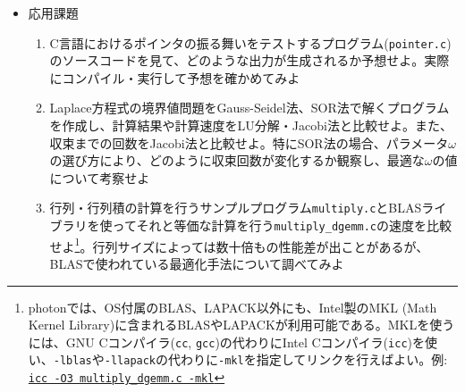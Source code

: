 \documentclass[11pt]{jarticle}
\begin{document}
\begin{itemize}
\item 応用課題
  \begin{enumerate}
  \item C言語におけるポインタの振る舞いをテストするプログラム({\tt pointer.c})のソースコードを見て、どのような出力が生成されるか予想せよ。実際にコンパイル・実行して予想を確かめてみよ
  \item Laplace方程式の境界値問題をGauss-Seidel法、SOR法で解くプログラムを作成し、計算結果や計算速度をLU分解・Jacobi法と比較せよ。また、収束までの回数をJacobi法と比較せよ。特にSOR法の場合、パラメータ$\omega$の選び方により、どのように収束回数が変化するか観察し、最適な$\omega$の値について考察せよ
  \item 行列・行列積の計算を行うサンプルプログラム{\tt multiply.c}とBLASライブラリを使ってそれと等価な計算を行う{\tt multiply\_dgemm.c}の速度を比較せよ\footnote{photonでは、OS付属のBLAS、LAPACK以外にも、Intel製のMKL (Math Kernel Library)に含まれるBLASやLAPACKが利用可能である。MKLを使うには、GNU Cコンパイラ({\tt cc}, {\tt gcc})の代わりにIntel Cコンパイラ({\tt icc})を使い、{\tt -lblas}や{\tt -llapack}の代わりに{\tt -mkl}を指定してリンクを行えばよい。例: \underline{\tt icc -O3 multiply\_dgemm.c -mkl}}。行列サイズによっては数十倍もの性能差が出ことがあるが、BLASで使われている最適化手法について調べてみよ
  \end{enumerate}  
\end{itemize}
\end{document}
